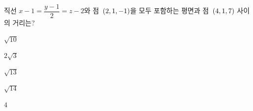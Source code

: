 직선 $x-1=\dfrac{y-1}{2}=z-2$와 점~$(2{,}\mkern3mu\mathopen{}1{,}\mkern3mu\mathopen{}-1)$을 모두 포함하는 평면과 점~$(4{,}\mkern3mu\mathopen{}1{,}\mkern3mu\mathopen{}7)$ 사이의 거리는?
\begin{choices32}{\rule[-3ex]{0pt}{8ex}$\sqrt{10}$}{\rule[-3ex]{0pt}{8ex}$2\sqrt{3}$}{\rule[-3ex]{0pt}{8ex}$\sqrt{13}$}{\rule[-3ex]{0pt}{8ex}$\sqrt{14}$}{\rule[-3ex]{0pt}{8ex}$4$}\end{choices32}
